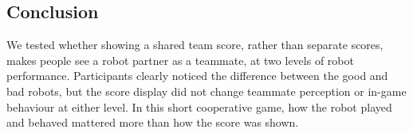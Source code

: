 \subsection{Conclusion}
We tested whether showing a shared team score, rather than separate scores, makes people see a robot partner as a teammate, at two levels of robot performance. Participants clearly noticed the difference between the good and bad robots, but the score display did not change teammate perception or in-game behaviour at either level. In this short cooperative game, how the robot played and behaved mattered more than how the score was shown.
